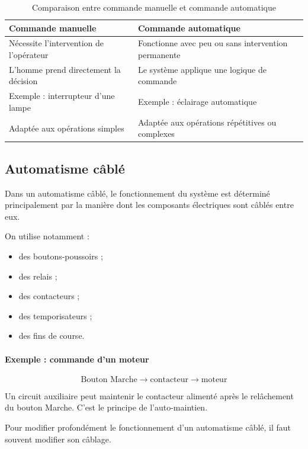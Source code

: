 \documentclass[12pt,a4paper]{book}
\begin{document}
\begin{table}[h]
\centering
\begin{tabularx}{\textwidth}{|X|X|}
\hline
\textbf{Commande manuelle} & \textbf{Commande automatique} \\
\hline
Nécessite l'intervention de l'opérateur & Fonctionne avec peu ou sans intervention permanente \\
\hline
L'homme prend directement la décision & Le système applique une logique de commande \\
\hline
Exemple : interrupteur d'une lampe & Exemple : éclairage automatique \\
\hline
Adaptée aux opérations simples & Adaptée aux opérations répétitives ou complexes \\
\hline
\end{tabularx}
\caption{Comparaison entre commande manuelle et commande automatique}
\end{table}

\subsection{Automatisme câblé}

Dans un automatisme câblé, le fonctionnement du système est déterminé principalement par la manière dont les composants électriques sont câblés entre eux.

On utilise notamment :

\begin{itemize}
    \item des boutons-poussoirs ;
    \item des relais ;
    \item des contacteurs ;
    \item des temporisateurs ;
    \item des fins de course.
\end{itemize}

\paragraph{Exemple : commande d'un moteur}

\[
\text{Bouton Marche} \rightarrow \text{contacteur} \rightarrow \text{moteur}
\]

Un circuit auxiliaire peut maintenir le contacteur alimenté après le relâchement du bouton Marche. C'est le principe de l'auto-maintien.

Pour modifier profondément le fonctionnement d'un automatisme câblé, il faut souvent modifier son câblage.
\end{document}
